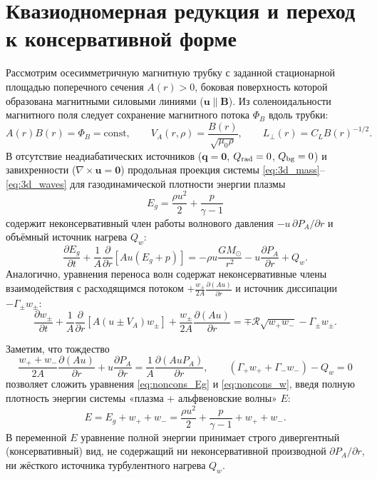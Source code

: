 \documentclass[11pt,a4paper]{article}
\begin{document}
\section{Квазиодномерная редукция и переход к консервативной форме}

Рассмотрим осесимметричную магнитную трубку с заданной стационарной площадью поперечного сечения $A(r) > 0$, боковая поверхность которой образована магнитными силовыми линиями ($\bm{u} \parallel \bm{B}$). Из соленоидальности магнитного поля следует сохранение магнитного потока $\Phi_B$ вдоль трубки:
\begin{equation}
A(r)B(r) = \Phi_B = \mathrm{const}, \qquad V_A(r,\rho) = \frac{B(r)}{\sqrt{\mu_0\rho}}, \qquad L_\perp(r) = C_L B(r)^{-1/2}.
\label{eq:flux_tube}
\end{equation}
В отсутствие неадиабатических источников ($\bm{q}=\bm{0}$, $Q_{\rm rad}=0$, $Q_{\rm bg}=0$) и завихренности ($\nabla\times\bm{u}=\bm{0}$) продольная проекция системы \eqref{eq:3d_mass}--\eqref{eq:3d_waves} для газодинамической плотности энергии плазмы
\begin{equation}
E_g = \frac{\rho u^2}{2} + \frac{p}{\gamma-1}
\label{eq:gas_energy_def}
\end{equation}
содержит неконсервативный член работы волнового давления $-u\,\partial P_A/\partial r$ и объёмный источник нагрева $Q_w$:
\begin{equation}
\frac{\partial E_g}{\partial t} + \frac{1}{A}\frac{\partial}{\partial r}\left[A u (E_g + p)\right] = -\rho u \frac{GM_\odot}{r^2} - u\frac{\partial P_A}{\partial r} + Q_w.
\label{eq:noncons_Eg}
\end{equation}
Аналогично, уравнения переноса волн содержат неконсервативные члены взаимодействия с расходящимся потоком $+\frac{w_\pm}{2A}\frac{\partial(Au)}{\partial r}$ и источник диссипации $-\Gamma_\pm w_\pm$:
\begin{equation}
\frac{\partial w_\pm}{\partial t} + \frac{1}{A}\frac{\partial}{\partial r}\left[A(u \pm V_A)w_\pm\right] + \frac{w_\pm}{2A}\frac{\partial(Au)}{\partial r} = \mp\mathcal{R}\sqrt{w_+ w_-} - \Gamma_\pm w_\pm.
\label{eq:noncons_w}
\end{equation}

Заметим, что тождество
\[
\frac{w_+ + w_-}{2A}\frac{\partial(Au)}{\partial r} + u\frac{\partial P_A}{\partial r} = \frac{1}{A}\frac{\partial(A u P_A)}{\partial r}, \qquad (\Gamma_+ w_+ + \Gamma_- w_-) - Q_w = 0
\]
позволяет сложить уравнения \eqref{eq:noncons_Eg} и \eqref{eq:noncons_w}, введя полную плотность энергии системы «плазма + альфвеновские волны» $E$:
\begin{equation}
E = E_g + w_+ + w_- = \frac{\rho u^2}{2} + \frac{p}{\gamma-1} + w_+ + w_-.
\label{eq:total_energy_def}
\end{equation}
В переменной $E$ уравнение полной энергии принимает строго дивергентный (консервативный) вид, не содержащий ни неконсервативной производной $\partial P_A/\partial r$, ни жёсткого источника турбулентного нагрева $Q_w$.
\end{document}
